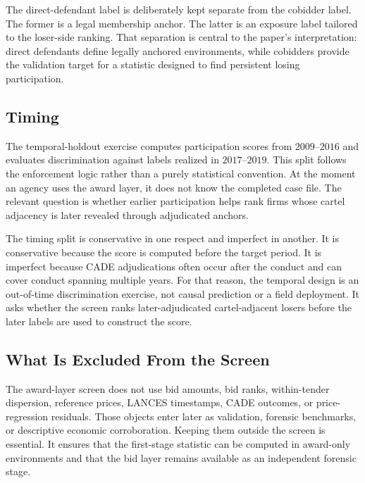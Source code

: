 The direct-defendant label is deliberately kept separate from the
cobidder label. The former is a legal membership anchor. The
latter is an exposure label tailored to the loser-side ranking.
That separation is central to the paper's interpretation: direct
defendants define legally anchored environments, while
cobidders provide the validation target for a statistic designed
to find persistent losing participation.

\subsection{Timing}
\label{app:timing_submission}

The temporal-holdout exercise computes participation scores from
$2009$--$2016$ and evaluates discrimination against labels
realized in $2017$--$2019$. This split follows the enforcement
logic rather than a purely statistical convention. At the moment
an agency uses the award layer, it does not know the completed
case file. The relevant question is whether earlier participation
helps rank firms whose cartel adjacency is later revealed through
adjudicated anchors.

The timing split is conservative in one respect and imperfect in
another. It is conservative because the score is computed before
the target period. It is imperfect because CADE adjudications
often occur after the conduct and can cover conduct spanning
multiple years. For that reason, the temporal design is an
out-of-time discrimination exercise, not causal prediction or a
field deployment. It asks whether the screen ranks
later-adjudicated cartel-adjacent losers before the later labels
are used to construct the score.

\subsection{What Is Excluded From the Screen}
\label{app:excluded_screen_submission}

The award-layer screen does not use bid amounts, bid ranks,
within-tender dispersion, reference prices, LANCES timestamps,
CADE outcomes, or price-regression residuals. Those objects enter
later as validation, forensic benchmarks, or descriptive economic
corroboration. Keeping them outside the screen is essential. It
ensures that the first-stage statistic can be computed in
award-only environments and that the bid layer remains available
as an independent forensic stage.
